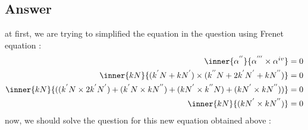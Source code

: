 \documentclass[
	12pt, %
]{fphw}
\theoremstyle{plain}
\begin{document}
\subsection*{Answer}
\setcounter{assumption}{0}
\setcounter{equation}{0}
at first, we are trying to simplified the equation in the question using Frenet equation :
\begin{align}
     \inner{\alpha^{''}}{\alpha^{'''}\times\alpha^{iv}} & = 0 \\
     \inner{kN}{(k^{'}N+kN^{'})\times(k^{''}N+2k^{'}N^{'}+kN^{''})} & = 0 \\
     \inner{kN}{((k^{'}N\times 2k^{'}N^{'})+(k^{'}N\times kN^{''})+(kN^{'}\times k^{''}N)+(kN^{'}\times kN^{''}))} & = 0 \\
     \inner{kN}{(kN^{'} \times kN^{''})} & = 0
\end{align}
now, we should solve the question for this new equation obtained above :
\end{document}

